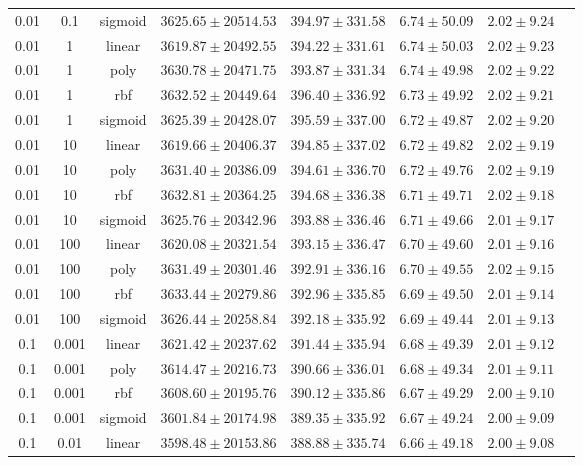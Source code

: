 \begin{tabular}{cccrrrrr}
0.01 & 0.1 & sigmoid & $3625.65 \pm 20514.53$ & $394.97 \pm 331.58$ & $6.74 \pm 50.09$ & $2.02 \pm 9.24$\\
0.01 & 1 & linear & $3619.87 \pm 20492.55$ & $394.22 \pm 331.61$ & $6.74 \pm 50.03$ & $2.02 \pm 9.23$\\
0.01 & 1 & poly & $3630.78 \pm 20471.75$ & $393.87 \pm 331.34$ & $6.74 \pm 49.98$ & $2.02 \pm 9.22$\\
0.01 & 1 & rbf & $3632.52 \pm 20449.64$ & $396.40 \pm 336.92$ & $6.73 \pm 49.92$ & $2.02 \pm 9.21$\\
0.01 & 1 & sigmoid & $3625.39 \pm 20428.07$ & $395.59 \pm 337.00$ & $6.72 \pm 49.87$ & $2.02 \pm 9.20$\\
0.01 & 10 & linear & $3619.66 \pm 20406.37$ & $394.85 \pm 337.02$ & $6.72 \pm 49.82$ & $2.02 \pm 9.19$\\
0.01 & 10 & poly & $3631.40 \pm 20386.09$ & $394.61 \pm 336.70$ & $6.72 \pm 49.76$ & $2.02 \pm 9.19$\\
0.01 & 10 & rbf & $3632.81 \pm 20364.25$ & $394.68 \pm 336.38$ & $6.71 \pm 49.71$ & $2.02 \pm 9.18$\\
0.01 & 10 & sigmoid & $3625.76 \pm 20342.96$ & $393.88 \pm 336.46$ & $6.71 \pm 49.66$ & $2.01 \pm 9.17$\\
0.01 & 100 & linear & $3620.08 \pm 20321.54$ & $393.15 \pm 336.47$ & $6.70 \pm 49.60$ & $2.01 \pm 9.16$\\
0.01 & 100 & poly & $3631.49 \pm 20301.46$ & $392.91 \pm 336.16$ & $6.70 \pm 49.55$ & $2.02 \pm 9.15$\\
0.01 & 100 & rbf & $3633.44 \pm 20279.86$ & $392.96 \pm 335.85$ & $6.69 \pm 49.50$ & $2.01 \pm 9.14$\\
0.01 & 100 & sigmoid & $3626.44 \pm 20258.84$ & $392.18 \pm 335.92$ & $6.69 \pm 49.44$ & $2.01 \pm 9.13$\\
0.1 & 0.001 & linear & $3621.42 \pm 20237.62$ & $391.44 \pm 335.94$ & $6.68 \pm 49.39$ & $2.01 \pm 9.12$\\
0.1 & 0.001 & poly & $3614.47 \pm 20216.73$ & $390.66 \pm 336.01$ & $6.68 \pm 49.34$ & $2.01 \pm 9.11$\\
0.1 & 0.001 & rbf & $3608.60 \pm 20195.76$ & $390.12 \pm 335.86$ & $6.67 \pm 49.29$ & $2.00 \pm 9.10$\\
0.1 & 0.001 & sigmoid & $3601.84 \pm 20174.98$ & $389.35 \pm 335.92$ & $6.67 \pm 49.24$ & $2.00 \pm 9.09$\\
0.1 & 0.01 & linear & $3598.48 \pm 20153.86$ & $388.88 \pm 335.74$ & $6.66 \pm 49.18$ & $2.00 \pm 9.08$\\

\end{tabular}
